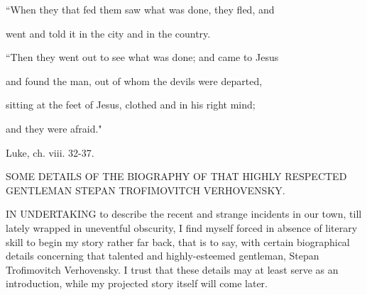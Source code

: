 \documentclass[12pt]{article}
\begin{document}
{\vspace{12pt}
     ``When they that fed them saw what was done, they fled, and

     went and told it in the city and in the country.



\vspace{12pt}
     ``Then they went out to see what was done; and came to Jesus

     and found the man, out of whom the devils were departed,

     sitting at the feet of Jesus, clothed and in his right mind;

     and they were afraid."



\vspace{12pt}
     Luke, ch. viii. 32-37.









}
\setcounter{page}{1}

{\scriptsize \noindent 

\vspace{12pt}
SOME DETAILS OF THE BIOGRAPHY OF THAT HIGHLY RESPECTED GENTLEMAN STEPAN
TROFIMOVITCH VERHOVENSKY.}
\vspace{12pt}



\vspace{12pt}
IN UNDERTAKING to describe the recent and strange incidents in our town,
till lately wrapped in uneventful obscurity, I find myself forced in
absence of literary skill to begin my story rather far back, that is
to say, with certain biographical details concerning that talented and
highly-esteemed gentleman, Stepan Trofimovitch Verhovensky. I trust that
these details may at least serve as an introduction, while my projected
story itself will come later.
\end{document}
